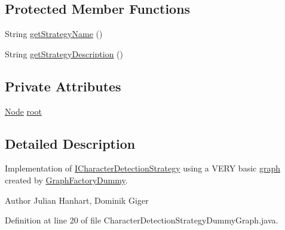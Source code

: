 \subsection*{Protected Member Functions}
\begin{DoxyCompactItemize}
\item 
String \hyperlink{classch_1_1zhaw_1_1ba10__bsha__1_1_1strategies_1_1CharacterDetectionStrategyDummyGraph_a8daf8f26a2d43d7b8e8e7be71e1edae5}{getStrategyName} ()
\item 
String \hyperlink{classch_1_1zhaw_1_1ba10__bsha__1_1_1strategies_1_1CharacterDetectionStrategyDummyGraph_a5cb3260ddc362ed0979fa45d927c5be0}{getStrategyDescription} ()
\end{DoxyCompactItemize}
\subsection*{Private Attributes}
\begin{DoxyCompactItemize}
\item 
\hyperlink{classch_1_1zhaw_1_1ba10__bsha__1_1_1graph_1_1Node}{Node} \hyperlink{classch_1_1zhaw_1_1ba10__bsha__1_1_1strategies_1_1CharacterDetectionStrategyDummyGraph_a734b7506e0104434524a5cb0db0ad7d4}{root}
\end{DoxyCompactItemize}


\subsection{Detailed Description}
Implementation of \hyperlink{interfacech_1_1zhaw_1_1ba10__bsha__1_1_1strategies_1_1ICharacterDetectionStrategy}{ICharacterDetectionStrategy} using a VERY basic \hyperlink{namespacech_1_1zhaw_1_1ba10__bsha__1_1_1graph}{graph} created by \hyperlink{}{GraphFactoryDummy}.

\begin{DoxyAuthor}{Author}
Julian Hanhart, Dominik Giger 
\end{DoxyAuthor}


Definition at line 20 of file CharacterDetectionStrategyDummyGraph.java.

